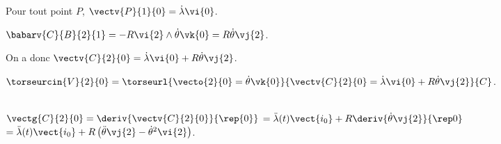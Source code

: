 Pour tout point $P$, $\vectv{P}{1}{0}=\dot{\lambda}\vi{0}$.

$\babarv{C}{B}{2}{1}=-R\vi{2}\wedge \dot{\theta}\vk{0}=R\dot{\theta}\vj{2}$.

On a donc $\vectv{C}{2}{0}=\dot{\lambda}\vi{0}+R\dot{\theta}\vj{2}$.

\else
\fi

\ifprof

$\torseurcin{V}{2}{0}=\torseurl{\vecto{2}{0}=\dot{\theta}\vk{0}}{\vectv{C}{2}{0}=\dot{\lambda}\vi{0}+R\dot{\theta}\vj{2}}{C}$.


\else
\fi

\ifprof ~\\

$\vectg{C}{2}{0} =\deriv{\vectv{C}{2}{0}}{\rep{0}}$
$= \ddot{\lambda}(t) \vect{i_0} + R \deriv{\dot{\theta} \vj{2}}{\rep0}$
$= \ddot{\lambda}(t) \vect{i_0} + R \left(\ddot{\theta} \vj{2} - \dot{\theta}^2 \vi{2}\right) $.
\else
\fi

